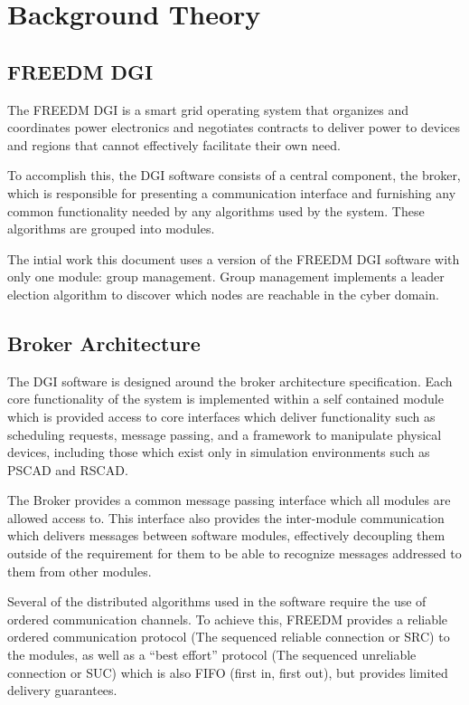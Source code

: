 \section{Background Theory}
\subsection{FREEDM DGI}
The FREEDM DGI is a smart grid operating system that organizes and coordinates 
power electronics and negotiates contracts to deliver power to devices and 
regions that cannot effectively facilitate their own need.

To accomplish this, the DGI software consists of a central component, the 
broker, which is responsible for presenting a communication interface and 
furnishing any common functionality needed by any algorithms used by the 
system. These algorithms are grouped into modules.

The intial work this document uses a version of the FREEDM DGI software with 
only one module: group management. Group management implements a leader
election algorithm to discover which nodes are reachable in the cyber domain.

\subsection{Broker Architecture}

The DGI software is designed around the broker architecture specification. Each 
core functionality of the system is implemented within a self contained module 
which is provided access to core interfaces which deliver functionality such as 
scheduling requests, message passing, and a framework to manipulate physical 
devices, including those which exist only in simulation environments such as 
PSCAD\cite{PSCAD} and RSCAD\cite{RSCAD}.

The Broker provides a common message passing interface which all modules are 
allowed access to. This interface also provides the inter-module communication 
which delivers messages between software modules, effectively decoupling them 
outside of the requirement for them to be able to recognize messages addressed 
to them from other modules.

Several of the distributed algorithms used in the software require the use of 
ordered communication channels. To achieve this, FREEDM provides a reliable 
ordered communication protocol (The sequenced reliable connection or SRC) to 
the modules, as well as a ``best effort'' protocol (The sequenced unreliable 
connection or SUC) which is also FIFO (first in, first out), but provides 
limited delivery guarantees.

